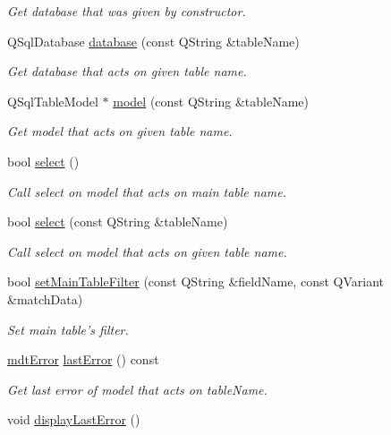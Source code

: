 \begin{DoxyCompactItemize}
\begin{DoxyCompactList}\small\item\em Get database that was given by constructor. \end{DoxyCompactList}\item 
QSqlDatabase \hyperlink{classmdt_sql_form_aa9c2ce2607760a8ebebf3d88779637d4}{database} (const QString \&tableName)
\begin{DoxyCompactList}\small\item\em Get database that acts on given table name. \end{DoxyCompactList}\item 
QSqlTableModel $\ast$ \hyperlink{classmdt_sql_form_ac3f257a2711f66b3cdd811804c0f11b0}{model} (const QString \&tableName)
\begin{DoxyCompactList}\small\item\em Get model that acts on given table name. \end{DoxyCompactList}\item 
bool \hyperlink{classmdt_sql_form_a2a2f564fe934cc8997b07f90abb771e1}{select} ()
\begin{DoxyCompactList}\small\item\em Call select on model that acts on main table name. \end{DoxyCompactList}\item 
bool \hyperlink{classmdt_sql_form_ae9a1f8c03e5ac8ccd01fa804356abd01}{select} (const QString \&tableName)
\begin{DoxyCompactList}\small\item\em Call select on model that acts on given table name. \end{DoxyCompactList}\item 
bool \hyperlink{classmdt_sql_form_abfc6d7f49debf02f5016923cbd422f2f}{setMainTableFilter} (const QString \&fieldName, const QVariant \&matchData)
\begin{DoxyCompactList}\small\item\em Set main table's filter. \end{DoxyCompactList}\item 
\hyperlink{classmdt_error}{mdtError} \hyperlink{classmdt_sql_form_a04724293298421c404e93c58015cda5e}{lastError} () const 
\begin{DoxyCompactList}\small\item\em Get last error of model that acts on tableName. \end{DoxyCompactList}\item 
\hypertarget{classmdt_sql_form_a7521d231f24663ee1d2acb904387353b}{
void \hyperlink{classmdt_sql_form_a7521d231f24663ee1d2acb904387353b}{displayLastError} ()}
\label{classmdt_sql_form_a7521d231f24663ee1d2acb904387353b}


\end{DoxyCompactItemize}
